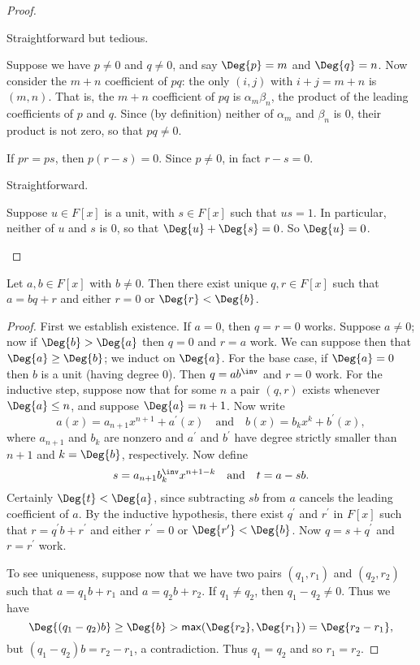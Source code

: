 \documentclass{memoir}
\begin{document}
\begin{proof} \mbox{}
\begin{enumerate*}
\item Straightforward but tedious.
\item Suppose we have $p \neq 0$ and $q \neq 0$, and say $\Deg{p} = m$ and $\Deg{q} = n$. Now consider the $m+n$ coefficient of $pq$: the only $(i,j)$ with $i+j = m+n$ is $(m,n)$. That is, the $m+n$ coefficient of $pq$ is $\alpha_m\beta_n$, the product of the leading coefficients of $p$ and $q$. Since (by definition) neither of $\alpha_m$ and $\beta_n$ is 0, their product is not zero, so that $pq \neq 0$.
\item If $pr = ps$, then $p(r-s) = 0$. Since $p \neq 0$, in fact $r-s = 0$.
\item Straightforward.
\item Suppose $u \in F[x]$ is a unit, with $s \in F[x]$ such that $us = 1$. In particular, neither of $u$ and $s$ is 0, so that $\Deg{u}+\Deg{s} = 0$. So $\Deg{u} = 0$. \qedhere
\end{enumerate*}
\end{proof}

\begin{prp}
Let $a,b \in F[x]$ with $b \neq 0$. Then there exist unique $q,r \in F[x]$ such that $a = bq + r$ and either $r = 0$ or $\Deg{r} < \Deg{b}$.
\end{prp}

\begin{proof}
First we establish existence. If $a = 0$, then $q = r = 0$ works. Suppose $a \neq 0$; now if $\Deg{b} > \Deg{a}$ then $q = 0$ and $r = a$ work. We can suppose then that $\Deg{a} \geq \Deg{b}$; we induct on $\Deg{a}$. For the base case, if $\Deg{a} = 0$ then $b$ is a unit (having degree 0). Then $q = ab^\inv$ and $r = 0$ work. For the inductive step, suppose now that for some $n$ a pair $(q,r)$ exists whenever $\Deg{a} \leq n$, and suppose $\Deg{a} = n+1$. Now write \[ a(x) = a_{n+1} x^{n+1} + a^\prime(x) \quad \mathrm{and} \quad b(x) = b_k x^k + b^\prime(x), \] where $a_{n+1}$ and $b_k$ are nonzero and $a^\prime$ and $b^\prime$ have degree strictly smaller than $n+1$ and $k = \Deg{b}$, respectively. Now define \[ s = a_{n+1} b_k^\inv x^{n+1-k} \quad \mathrm{and} \quad t = a - sb. \] Certainly $\Deg{t} < \Deg{a}$, since subtracting $sb$ from $a$ cancels the leading coefficient of $a$. By the inductive hypothesis, there exist $q^\prime$ and $r^\prime$ in $F[x]$ such that $r = q^\prime b + r^\prime$ and either $r^\prime = 0$ or $\Deg{r^\prime} < \Deg{b}$. Now $q = s+q^\prime$ and $r = r^\prime$ work.

To see uniqueness, suppose now that we have two pairs $(q_1,r_1)$ and $(q_2,r_2)$ such that $a = q_1 b + r_1$ and $a = q_2 b + r_2$. If $q_1 \neq q_2$, then $q_1 - q_2 \neq 0$. Thus we have \[ \Deg{(q_1-q_2)b} \geq \Deg{b} > \mathsf{max}(\Deg{r_2},\Deg{r_1}) = \Deg{r_2-r_1}, \] but $(q_1-q_2)b = r_2-r_1$, a contradiction. Thus $q_1 = q_2$ and so $r_1 = r_2$.
\end{proof}
\end{document}
